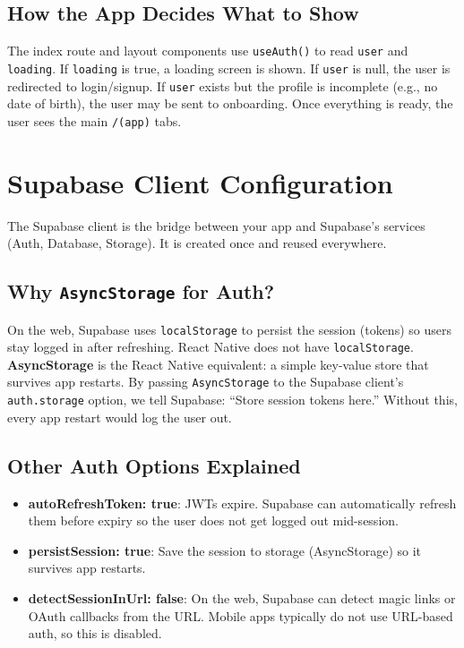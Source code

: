 \documentclass[11pt,a4paper]{article}
\begin{document}
\subsection{How the App Decides What to Show}

The index route and layout components use \texttt{useAuth()} to read \texttt{user} and \texttt{loading}. If \texttt{loading} is true, a loading screen is shown. If \texttt{user} is null, the user is redirected to login/signup. If \texttt{user} exists but the profile is incomplete (e.g., no date of birth), the user may be sent to onboarding. Once everything is ready, the user sees the main \texttt{/(app)} tabs.

\section{Supabase Client Configuration}

The Supabase client is the bridge between your app and Supabase's services (Auth, Database, Storage). It is created once and reused everywhere.

\subsection{Why \texttt{AsyncStorage} for Auth?}

On the web, Supabase uses \texttt{localStorage} to persist the session (tokens) so users stay logged in after refreshing. React Native does not have \texttt{localStorage}. \textbf{AsyncStorage} is the React Native equivalent: a simple key-value store that survives app restarts. By passing \texttt{AsyncStorage} to the Supabase client's \texttt{auth.storage} option, we tell Supabase: ``Store session tokens here.'' Without this, every app restart would log the user out.

\subsection{Other Auth Options Explained}

\begin{itemize}[leftmargin=*]
    \item \textbf{autoRefreshToken: true}: JWTs expire. Supabase can automatically refresh them before expiry so the user does not get logged out mid-session.
    \item \textbf{persistSession: true}: Save the session to storage (AsyncStorage) so it survives app restarts.
    \item \textbf{detectSessionInUrl: false}: On the web, Supabase can detect magic links or OAuth callbacks from the URL. Mobile apps typically do not use URL-based auth, so this is disabled.
\end{itemize}
\end{document}
